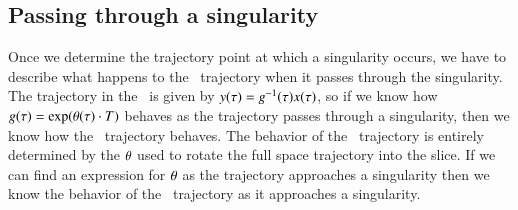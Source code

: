 


    \fi %

\subsection{Passing through a singularity}
\label{sect:passingSing}

Once we determine the trajectory point at which a singularity occurs, we have to describe what happens to the \reducedsp\ trajectory when it passes through the singularity. The trajectory in the \reducedsp\ is given by $y(\tau)=g^{-1}(\tau) x(\tau)$, so if we know how $g(\tau)=\exp({{\bf \theta}(\tau) \cdot T})$ behaves as the trajectory passes through a singularity, then we know how the \reducedsp\ trajectory behaves.
The behavior of the \reducedsp\ trajectory is entirely determined by the ${\bf \theta}$ used to rotate the full space trajectory into the slice. If we can find an expression for ${\bf \theta}$ as the trajectory approaches a singularity then we know the behavior of the \reducedsp\ trajectory as it approaches a singularity.

